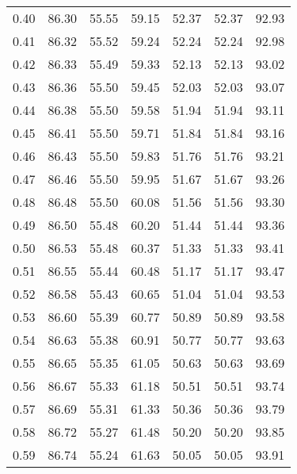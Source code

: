 \begin{tabular}{|c|c|c|c|c|c|c|}
      0.40 &     86.30 &     55.55 &      59.15 &   52.37 &      52.37 &         92.93 \\
      0.41 &     86.32 &     55.52 &      59.24 &   52.24 &      52.24 &         92.98 \\
      0.42 &     86.33 &     55.49 &      59.33 &   52.13 &      52.13 &         93.02 \\
      0.43 &     86.36 &     55.50 &      59.45 &   52.03 &      52.03 &         93.07 \\
      0.44 &     86.38 &     55.50 &      59.58 &   51.94 &      51.94 &         93.11 \\
      0.45 &     86.41 &     55.50 &      59.71 &   51.84 &      51.84 &         93.16 \\
      0.46 &     86.43 &     55.50 &      59.83 &   51.76 &      51.76 &         93.21 \\
      0.47 &     86.46 &     55.50 &      59.95 &   51.67 &      51.67 &         93.26 \\
      0.48 &     86.48 &     55.50 &      60.08 &   51.56 &      51.56 &         93.30 \\
      0.49 &     86.50 &     55.48 &      60.20 &   51.44 &      51.44 &         93.36 \\
      0.50 &     86.53 &     55.48 &      60.37 &   51.33 &      51.33 &         93.41 \\
      0.51 &     86.55 &     55.44 &      60.48 &   51.17 &      51.17 &         93.47 \\
      0.52 &     86.58 &     55.43 &      60.65 &   51.04 &      51.04 &         93.53 \\
      0.53 &     86.60 &     55.39 &      60.77 &   50.89 &      50.89 &         93.58 \\
      0.54 &     86.63 &     55.38 &      60.91 &   50.77 &      50.77 &         93.63 \\
      0.55 &     86.65 &     55.35 &      61.05 &   50.63 &      50.63 &         93.69 \\
      0.56 &     86.67 &     55.33 &      61.18 &   50.51 &      50.51 &         93.74 \\
      0.57 &     86.69 &     55.31 &      61.33 &   50.36 &      50.36 &         93.79 \\
      0.58 &     86.72 &     55.27 &      61.48 &   50.20 &      50.20 &         93.85 \\
      0.59 &     86.74 &     55.24 &      61.63 &   50.05 &      50.05 &         93.91 \\

\end{tabular}
